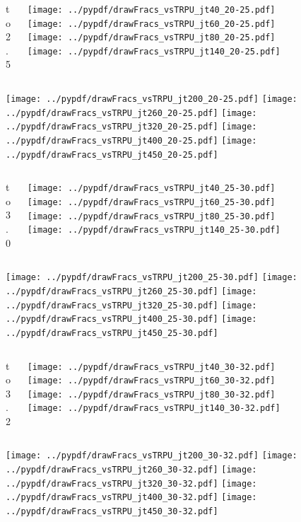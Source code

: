 \documentclass[aspectratio=169]{beamer}
\begin{document}
\begin{figure}[p]
\flushleft
\begin{columns}[T]
\begin{column}{.2\linewidth}
 to 2.5
\end{column}
\begin{column}{.8\linewidth}
\texttt{[image: ../pypdf/drawFracs\_vsTRPU\_jt40\_20-25.pdf]}
\texttt{[image: ../pypdf/drawFracs\_vsTRPU\_jt60\_20-25.pdf]}
\texttt{[image: ../pypdf/drawFracs\_vsTRPU\_jt80\_20-25.pdf]}
\texttt{[image: ../pypdf/drawFracs\_vsTRPU\_jt140\_20-25.pdf]}
\end{column}
\end{columns}
\texttt{[image: ../pypdf/drawFracs\_vsTRPU\_jt200\_20-25.pdf]}
\texttt{[image: ../pypdf/drawFracs\_vsTRPU\_jt260\_20-25.pdf]}
\texttt{[image: ../pypdf/drawFracs\_vsTRPU\_jt320\_20-25.pdf]}
\texttt{[image: ../pypdf/drawFracs\_vsTRPU\_jt400\_20-25.pdf]}
\texttt{[image: ../pypdf/drawFracs\_vsTRPU\_jt450\_20-25.pdf]}
\end{figure}

\begin{figure}[p]
\flushleft
\begin{columns}[T]
\begin{column}{.2\linewidth}
 to 3.0
\end{column}
\begin{column}{.8\linewidth}
\texttt{[image: ../pypdf/drawFracs\_vsTRPU\_jt40\_25-30.pdf]}
\texttt{[image: ../pypdf/drawFracs\_vsTRPU\_jt60\_25-30.pdf]}
\texttt{[image: ../pypdf/drawFracs\_vsTRPU\_jt80\_25-30.pdf]}
\texttt{[image: ../pypdf/drawFracs\_vsTRPU\_jt140\_25-30.pdf]}
\end{column}
\end{columns}
\texttt{[image: ../pypdf/drawFracs\_vsTRPU\_jt200\_25-30.pdf]}
\texttt{[image: ../pypdf/drawFracs\_vsTRPU\_jt260\_25-30.pdf]}
\texttt{[image: ../pypdf/drawFracs\_vsTRPU\_jt320\_25-30.pdf]}
\texttt{[image: ../pypdf/drawFracs\_vsTRPU\_jt400\_25-30.pdf]}
\texttt{[image: ../pypdf/drawFracs\_vsTRPU\_jt450\_25-30.pdf]}
\end{figure}

\begin{figure}[p]
\flushleft
\begin{columns}[T]
\begin{column}{.2\linewidth}
 to 3.2
\end{column}
\begin{column}{.8\linewidth}
\texttt{[image: ../pypdf/drawFracs\_vsTRPU\_jt40\_30-32.pdf]}
\texttt{[image: ../pypdf/drawFracs\_vsTRPU\_jt60\_30-32.pdf]}
\texttt{[image: ../pypdf/drawFracs\_vsTRPU\_jt80\_30-32.pdf]}
\texttt{[image: ../pypdf/drawFracs\_vsTRPU\_jt140\_30-32.pdf]}
\end{column}
\end{columns}
\texttt{[image: ../pypdf/drawFracs\_vsTRPU\_jt200\_30-32.pdf]}
\texttt{[image: ../pypdf/drawFracs\_vsTRPU\_jt260\_30-32.pdf]}
\texttt{[image: ../pypdf/drawFracs\_vsTRPU\_jt320\_30-32.pdf]}
\texttt{[image: ../pypdf/drawFracs\_vsTRPU\_jt400\_30-32.pdf]}
\texttt{[image: ../pypdf/drawFracs\_vsTRPU\_jt450\_30-32.pdf]}
\end{figure}
\end{document}
